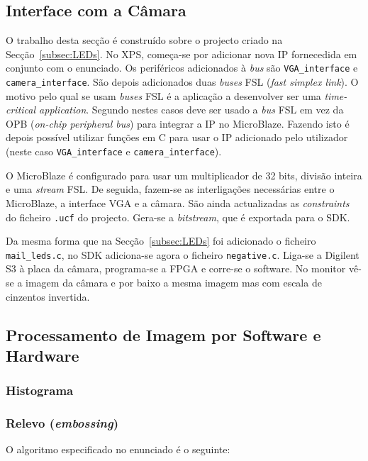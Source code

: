 \documentclass[a4paper]{article}
\begin{document}
\subsection{Interface com a Câmara}

O trabalho desta secção é construído sobre o projecto criado na Secção~\ref{subsec:LEDs}. No XPS, começa-se por adicionar nova IP fornecedida em conjunto com o enunciado. Os periféricos adicionados à \textit{bus} são \texttt{VGA\_interface} e \texttt{camera\_interface}. São depois adicionados duas \textit{buses} FSL (\textit{fast simplex link}). O motivo pelo qual se usam \textit{buses} FSL é a aplicação a desenvolver ser uma \textit{time-critical application}. Segundo \cite{bib:appnoteXilinxFSL} nestes casos deve ser usado a \textit{bus} FSL em vez da OPB (\textit{on-chip peripheral bus}) para integrar a IP no MicroBlaze. Fazendo isto é depois possível utilizar funções em C para usar o IP adicionado pelo utilizador (neste caso \texttt{VGA\_interface} e \texttt{camera\_interface}).

O MicroBlaze é configurado para usar um multiplicador de 32 bits, divisão inteira e uma \textit{stream} FSL. De seguida, fazem-se as interligações necessárias entre o MicroBlaze, a interface VGA e a câmara. São ainda actualizadas as \textit{constraints} do ficheiro \texttt{.ucf} do projecto. Gera-se a \textit{bitstream}, que é exportada para o SDK.

Da mesma forma que na Secção~\ref{subsec:LEDs} foi adicionado o ficheiro \texttt{mail\_leds.c}, no SDK adiciona-se agora o ficheiro \texttt{negative.c}. Liga-se a Digilent S3 à placa da câmara, programa-se a FPGA e corre-se o software. No monitor vê-se a imagem da câmara e por baixo a mesma imagem mas com escala de cinzentos invertida.

\subsection{Processamento de Imagem por Software e Hardware}
\subsubsection{Histograma}


\subsubsection{Relevo (\textit{embossing})}

O algoritmo especificado no enunciado é o seguinte:
\end{document}
